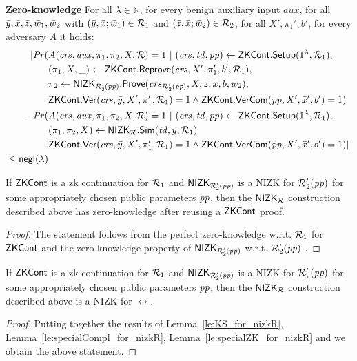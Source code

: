\noindent \textbf{Zero-knowledge } For all $\lambda \in \mathbb{N}$, for every benign auxiliary input $aux$, 
for all $\bar{y},\bar{x},\bar{z}, \bar{w}_1, \bar{w}_2$ with $(\bar{y}, \bar{x}; \bar{w}_1) \in \mathcal{R}_1$ and $(\bar{z}, \bar{x}; \bar{w}_2) \in \mathcal{R}_2$, for all $X',\pi_1', b'$, for every adversary $A$ it holds:
\begin{align*}
| \mathit{Pr}(& A(\mathit{crs}, \mathit{aux}, \pi_1,\pi_2, X, \mathcal{R}) = 1 \ | \ (\mathit{crs}, \mathit{td}, \mathit{pp}) \leftarrow {\ensuremath{\mathsf{ZKCont}}}.{\mathsf{Setup}} (1^{\lambda}, \mathcal{R}_1), \\
                  &(\pi_1, X, \_) \leftarrow {\ensuremath{\mathsf{ZKCont}}}.{\mathsf{Reprove}} (\mathit{crs}, X', \pi_1', b', \mathcal{R}_1), \\
                  & \pi_2 \leftarrow {\ensuremath{\mathsf{NIZK_{\mathcal{R}'_2(\mathit{pp})}}}}.{\mathsf{Prove}}(\mathit{crs}_{\mathcal{R}'_2(\mathit{pp})}, X, \bar{z}, \bar{x}, b, \bar{w}_2), \\
                  &  {\mathsf{ZKCont}}.{\mathsf{Ver}}(\mathit{crs}, \bar{y}, X', \pi'_1, \mathcal{R}_1) = 1 
                  \wedge {\ensuremath{\mathsf{ZKCont}}}.{\mathsf{VerCom}}(\mathit{pp}, X', \bar{x}', b') = 1)   \\
- \mathit{Pr}(& A(\mathit{crs}, \mathit{aux}, \pi_1,\pi_2, X, \mathcal{R}) = 1 \ | \ (\mathit{crs}, \mathit{td}, \mathit{pp}) \leftarrow {\ensuremath{\mathsf{ZKCont}}}.{\mathsf{Setup}} (1^{\lambda}, \mathcal{R}_1), \\ 
                     & (\pi_1,\pi_2, X) \leftarrow {\ensuremath{\mathsf{NIZK_{\mathcal{R}}}}}.{\mathsf{Sim}}(\mathit{td}, \bar{y}, \mathcal{R}_1) \\ 
                     &  {\mathsf{ZKCont}}.{\mathsf{Ver}}(\mathit{crs}, \bar{y}, X', \pi'_1, \mathcal{R}_1) = 1 \wedge {\ensuremath{\mathsf{ZKCont}}}.{\mathsf{VerCom}}(\mathit{pp}, X', \bar{x}', b') = 1) | \\
                    \leq \mathsf{negl}(\lambda)
\end{align*}

\begin{lemma} 
\label{le:specialZK_for_nizkR}
If ${\mathsf{ZKCont}}$ is a zk continuation for $\mathcal{R}_1$ and ${\mathsf{NIZK_{\mathcal{R}'_2(\mathit{pp})}}}$ is a NIZK for $\mathcal{R}_2'(\mathit{pp})$ for some appropriately chosen public parameters $\mathit{pp}$, 
then the ${\mathsf{NIZK_{\mathcal{R}}}}$ construction described above has zero-knowledge after reusing a ${\mathsf{ZKCont}}$ proof.
\end{lemma} 
\begin{proof} The statement follows from the perfect zero-knowledge w.r.t. $\mathcal{R}_1$ for ${\mathsf{ZKCont}}$ and 
the zero-knowledge property of ${\mathsf{NIZK_{\mathcal{R}'_2(\mathit{pp})}}}$ w.r.t. $\mathcal{R}_2'(\mathit{pp})$ .
\end{proof}
 
\begin{corollary}
If ${\mathsf{ZKCont}}$ is a zk continuation for $\mathcal{R}_1$ and ${\mathsf{NIZK_{\mathcal{R}'_2(\mathit{pp})}}}$ is a NIZK for $\mathcal{R}_2'(\mathit{pp})$ for some appropriately chosen public parameters $\mathit{pp}$, 
then the ${\mathsf{NIZK_{\mathcal{R}}}}$ construction described above is a NIZK for $\rel$.
 \end{corollary}
 
\begin{proof} Putting together the results of Lemma~\ref{le:KS_for_nizkR}, Lemma~\ref{le:specialCompl_for_nizkR}, 
Lemma~\ref{le:specialZK_for_nizkR} and  we obtain the above statement.
\end{proof} 
